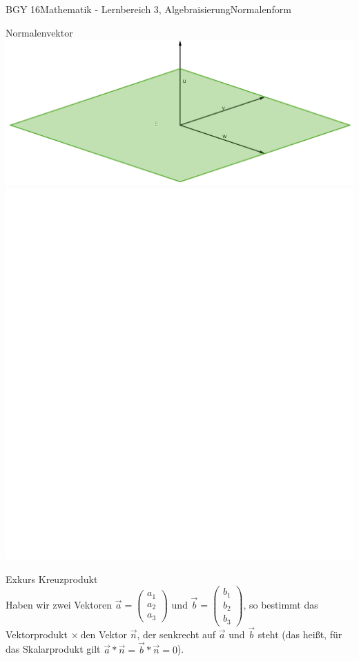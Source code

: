 \documentclass[oneside,openany,headings=optiontotoc,11pt,numbers=noenddot]{scrreprt}
\begin{document}
	\begin{worksheet}{BGY 16}{Mathematik - Lernbereich 3, Algebraisierung}{Normalenform}
		\begin{framed}
			\tiny{\color{codegray}Normalenvektor}\\
			\includegraphics[scale=0.25]{Bilder/NV.png}
			\includegraphics[scale=0.25]{../empty.jpg}		
		\end{framed}
		\begin{framed}
			\tiny{\color{codegray}Exkurs Kreuzprodukt}\\\normalsize
			Haben wir zwei Vektoren \(\vec{a}= \left(\begin{array}{c}a_1\\a_2\\a_3\end{array}\right)\) und \(\vec{b}= \left(\begin{array}{c}b_1\\b_2\\b_3\end{array}\right)\), so bestimmt das \color{blue}Vektorprodukt \(\times\ \)\normalcolor den Vektor \(\vec{n}\), der senkrecht auf \(\vec{a}\) und \(\vec{b}\) steht (das heißt, für das Skalarprodukt gilt \(\vec{a}*\vec{n}= \vec{b}*\vec{n} = 0\)).\\

\end{framed}
\end{worksheet}
\end{document}
